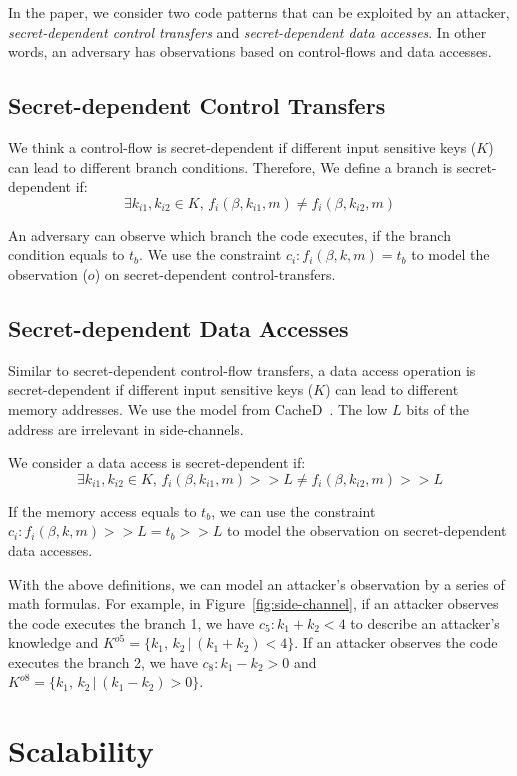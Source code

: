 In the paper, we consider two code patterns that can be exploited by an attacker,
\emph{secret-dependent control transfers} and \emph{secret-dependent data
accesses}. In other words, an adversary has observations based on control-flows
and data accesses.

\subsection{Secret-dependent Control Transfers}
We think a control-flow is secret-dependent if different input sensitive keys
($K$) can lead to different branch conditions. Therefore,
We define a branch is secret-dependent if:
$$\exists k_{i1}, k_{i2} \in K, \,f_i(\beta, k_{i1}, m) \neq f_i(\beta, k_{i2}, m)$$

An adversary can observe which branch the code executes, if the branch condition
equals to $t_b$. We use the constraint $c_i : f_i(\beta, k, m) = t_b$ to model
the observation ($o$) on secret-dependent control-transfers.

\subsection{Secret-dependent Data Accesses}
Similar to secret-dependent control-flow transfers, a data access operation is
secret-dependent if different input sensitive keys ($K$) can lead to different
memory addresses. We use the model from CacheD~\cite{203878}. The low $L$ bits
of the address are irrelevant in side-channels.

We consider a data access is secret-dependent if:
$$\exists k_{i1}, k_{i2} \in K, \,f_i(\beta, k_{i1}, m) >> L \neq f_i(\beta, k_{i2}, m) >> L$$

If the memory access equals to $t_b$, we can use the constraint $c_i :
f_i(\beta, k, m) >> L = t_b >> L$ to model the observation on secret-dependent
data accesses.

With the above definitions, we can model an attacker's observation by a series of math
formulas. For example, in Figure~\ref{fig:side-channel}, if an attacker observes
the code executes the branch 1, we have $c_5: k_1 + k_2 < 4$ to describe an
attacker's knowledge and $K^{o5} = \{k_1,\, k_2\,|\, (k_1 + k_2) < 4\}$. If an
attacker observes the code executes the branch 2, we have $c_8: k_1 - k_2 > 0$
and $K^{o8} = \{k_1,\, k_2\,|\, (k_1 - k_2) > 0\}$.
\section{Scalability}
